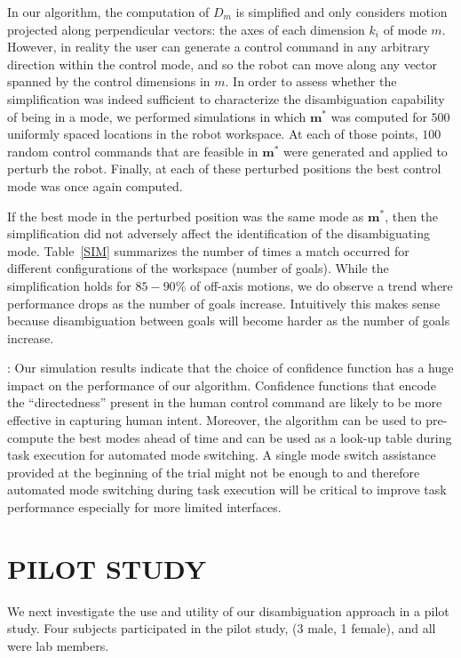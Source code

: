 \documentclass[conference]{IEEEtran}
\begin{document}
 In our algorithm, the computation of $D_{m}$ is simplified and only considers motion projected along perpendicular vectors: the axes of each dimension $k_i$ of mode $m$. However, in reality the user can generate a control command in any arbitrary direction within the control mode, and so the robot can move along any vector spanned by the control dimensions in $m$. In order to assess whether the simplification was indeed sufficient to characterize the disambiguation capability of being in a mode, we performed simulations in which $\boldsymbol{m}^*$ was computed for $500$ uniformly spaced locations in the robot workspace. At each of those points, $100$ random control commands that are feasible in $\boldsymbol{m}^*$ were generated and applied to perturb the robot. Finally, at each of these perturbed positions the best control mode was once again computed. 

If the best mode in the perturbed position was the same mode as $\boldsymbol{m}^*$, then the simplification did not adversely affect the identification of the disambiguating mode. Table~\ref{SIM} summarizes the number of times a match occurred for different configurations of the workspace (number of goals). While the simplification holds for $85-90\%$ of off-axis motions, we do observe a trend where performance drops as the number of goals increase. Intuitively this makes sense because disambiguation between goals will become harder as the number of goals increase. 
 
:  Our simulation results indicate that the choice of confidence function has a huge impact on the performance of our algorithm. Confidence functions that encode the ``directedness'' present in the human control command are likely to be more effective in capturing human intent.
 Moreover, the algorithm can be used to pre-compute the best modes ahead of time and can be used as a look-up table during task execution for automated mode switching. A single mode switch assistance provided at the beginning of the trial might not be enough to and therefore automated mode switching during task execution will be critical to improve task performance especially for more limited interfaces. 
\section{PILOT STUDY}\label{EXP}
We next investigate the use and utility of our disambiguation approach in a pilot study. Four subjects participated in the pilot study, (3 male, 1 female), and all were lab members.
\end{document}
